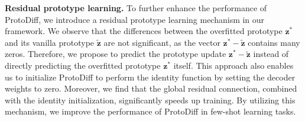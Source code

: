 \textbf{Residual prototype learning.}
To further enhance the performance of ProtoDiff, we introduce a residual prototype learning mechanism in our framework. We observe that the differences between the overfitted prototype $\mathbf{z}^*$ and its vanilla prototype $\tilde{\mathbf{z}}$ are not significant, as the vector $\mathbf{z}^* - \tilde{\mathbf{z}}$ contains many zeros. Therefore, we propose to predict the prototype update $\mathbf{z}^* -\tilde{\mathbf{z}}$ instead of directly predicting the overfitted prototype $\mathbf{z}^*$ itself. This approach also enables us to initialize ProtoDiff to perform the identity function by setting the decoder weights to zero. Moreover, we find that the global residual connection, combined with the identity initialization, significantly speeds up training. By utilizing this mechanism, we improve the performance of ProtoDiff in few-shot learning tasks. 

